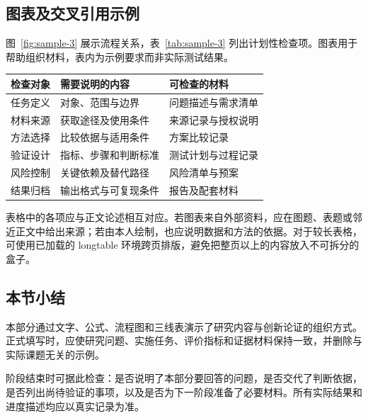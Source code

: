 \subsection{图表及交叉引用示例}
图~\ref{fig:sample-3} 展示流程关系，表~\ref{tab:sample-3} 列出计划性检查项。图表用于帮助组织材料，表内为示例要求而非实际测试结果。
\begin{center}
\begin{minipage}{\linewidth}\centering
{}
\label{fig:sample-3}
\end{minipage}\end{center}
\begin{center}\begin{minipage}{\linewidth}\centering
{}\label{tab:sample-3}
\begin{tabularx}{\linewidth}{p{23mm}XX}
\toprule
检查对象 & 需要说明的内容 & 可检查的材料\\
\midrule
任务定义 & 对象、范围与边界 & 问题描述与需求清单\\
材料来源 & 获取途径及使用条件 & 来源记录与授权说明\\
方法选择 & 比较依据与适用条件 & 方案比较记录\\
验证设计 & 指标、步骤和判断标准 & 测试计划与过程记录\\
风险控制 & 关键依赖及替代路径 & 风险清单与预案\\
结果归档 & 输出格式与可复现条件 & 报告及配套材料\\
\bottomrule
\end{tabularx}
\end{minipage}\end{center}
表格中的各项应与正文论述相互对应。若图表来自外部资料，应在图题、表题或邻近正文中给出来源；若由本人绘制，也应说明数据和方法的依据。对于较长表格，可使用已加载的 longtable 环境跨页排版，避免把整页以上的内容放入不可拆分的盒子。

\subsection{本节小结}
本部分通过文字、公式、流程图和三线表演示了研究内容与创新论证的组织方式。正式填写时，应使研究问题、实施任务、评价指标和证据材料保持一致，并删除与实际课题无关的示例。

阶段结束时可据此检查：是否说明了本部分要回答的问题，是否交代了判断依据，是否列出尚待验证的事项，以及是否为下一阶段准备了必要材料。所有实际结果和进度描述均应以真实记录为准。

